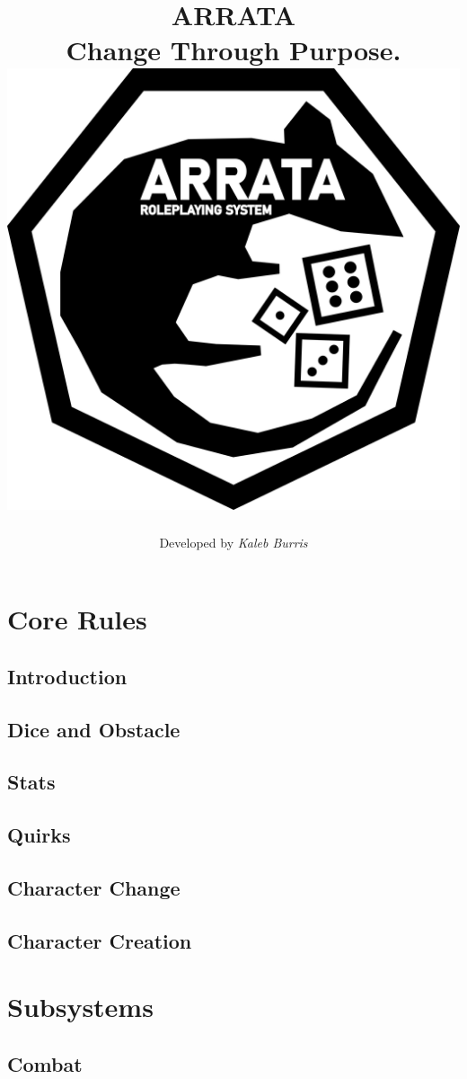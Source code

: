 \documentclass[oneside]{book}
\title{
    \textbf{ARRATA} 
    \\
    \large Change Through Purpose.
    \\
    \includegraphics[width=\textwidth]{rat.png}
}
\date{}
\author{Developed by {\em Kaleb Burris}}
\begin{document}
    \maketitle

    \let\cleardoublepage\clearpage
    \setlength{\headheight}{2cm}
    \addtolength{\topmargin}{-2cm}

    \tableofcontents

    \part{Core Rules}

    \chapter{Introduction}
    

    \chapter{Dice and Obstacle}

    \chapter{Stats}

    \chapter{Quirks}

    \chapter{Character Change}

    \chapter{Character Creation}

    \part{Subsystems}

    \chapter{Combat}
\end{document}
